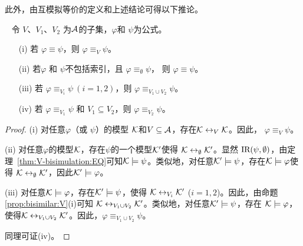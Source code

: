 此外，由互模拟等价的定义和上述结论可得以下推论。%
\begin{corollary}~\label{cor:eqbi}
	令 $V$、$V_1$、$V_2$ 为$\cal A$的子集，$\varphi$和 $\psi$为公式。
	\begin{itemize}
		\item[(i)] 若 $\varphi\equiv\psi$，则 $\varphi\equiv_V\psi$。
		\item[(ii)] 若$\varphi$ 和 $\psi$不包括索引，且 $\varphi\equiv_\emptyset\psi$， 则 $\varphi\equiv\psi$。
		\item[(iii)] 若 $\varphi\equiv_{V_i}\psi~(i=1,2)$，则 $\varphi\equiv_{V_1\cup V_2}\psi$。
		\item[(iv)] 若 $\varphi\equiv_{V_1}\psi$ 和 $V_1\subseteq V_2$，则 $\varphi\equiv_{V_2}\psi$。
	\end{itemize}
\end{corollary}
\begin{proof}
	(i) 对任意$\varphi$（或 $\psi$）的模型 ${\cal K}$和$V \subseteq {\cal A}$，存在${\cal K} \leftrightarrow_V {\cal K}$。因此， $\varphi\equiv_V\psi$。
	
	(ii) 对任意$\varphi$的模型${\cal K}$，存在$\psi$的一个模型${\cal K}'$使得 ${\cal K} \leftrightarrow_{\emptyset} {\cal K}'$。显然 $\textrm{IR}(\psi, \emptyset)$，由定理~\ref{thm:V-bisimulation:EQ}可知${\cal K} \models \psi$。类似地，对任意${\cal K}' \models \psi$，存在${\cal K} \models \varphi$使得 ${\cal K} \leftrightarrow_{\emptyset} {\cal K}'$，因此${\cal K}'\models \varphi$。
	
	(iii) 对任意${\cal K} \models \varphi$，存在${\cal K}' \models \psi$，使得 ${\cal K} \leftrightarrow_{V_i} {\cal K}'$ ($i=1,2$)。因此，由命题\ref{prop:bisimilar:V}(i)可知 ${\cal K} \leftrightarrow_{V_1\cup V_2} {\cal K}'$。类似地，对任意${\cal K}' \models \psi$，存在 ${\cal K} \models \varphi$，使得${\cal K} \leftrightarrow_{V_1\cup V_2} {\cal K}'$。因此，$\varphi\equiv_{V_1\cup V_2}\psi$。
	
	同理可证(iv)。
\end{proof}

